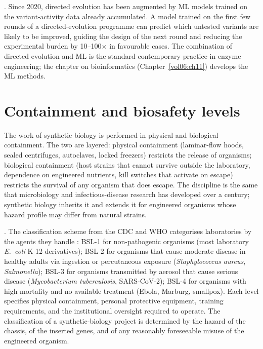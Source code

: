 
.
Since 2020, directed evolution has been augmented by ML models
trained on the variant-activity data already accumulated. A model
trained on the first few rounds of a directed-evolution programme
can predict which untested variants are likely to be improved,
guiding the design of the next round and reducing the experimental
burden by 10--100$\times$ in favourable cases. The combination of
directed evolution and ML is the standard contemporary practice in
enzyme engineering; the chapter on bioinformatics
(Chapter~\ref{vol06:ch11}) develops the ML methods.

\section{Containment and biosafety levels}

The work of synthetic biology is performed in physical and
biological containment. The two are layered: physical containment
(laminar-flow hoods, sealed centrifuges, autoclaves, locked
freezers) restricts the release of organisms; biological containment
(host strains that cannot survive outside the laboratory, dependence
on engineered nutrients, kill switches that activate on escape)
restricts the survival of any organism that does escape. The
discipline is the same that microbiology and infectious-disease
research has developed over a century; synthetic biology inherits
it and extends it for engineered organisms whose hazard profile may
differ from natural strains.


. The classification scheme
from the CDC and WHO categorises laboratories by the agents they
handle \cite[\S\,II]{web:v6c09-cdc-bmbl-6-2020}: BSL-1 for non-pathogenic
organisms (most laboratory \emph{E.\ coli} K-12 derivatives); BSL-2
for organisms that cause moderate disease in healthy adults via
ingestion or percutaneous exposure (\emph{Staphylococcus aureus},
\emph{Salmonella}); BSL-3 for organisms transmitted by aerosol that
cause serious disease (\emph{Mycobacterium tuberculosis}, SARS-CoV-2);
BSL-4 for organisms with high mortality and no available treatment
(Ebola, Marburg, smallpox). Each level specifies physical
containment, personal protective equipment, training requirements,
and the institutional oversight required to operate. The
classification of a synthetic-biology project is determined by the
hazard of the chassis, of the inserted genes, and of any reasonably
foreseeable misuse of the engineered organism.

